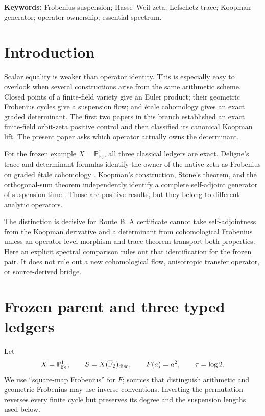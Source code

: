 \documentclass[11pt]{article}
\theoremstyle{remark}\newtheorem{remark}[theorem]{Remark}
\newcommand{\F}{\mathbb F}
\begin{document}
\medskip
\noindent\textbf{Keywords:} Frobenius suspension; Hasse--Weil zeta;
Lefschetz trace; Koopman generator; operator ownership; essential spectrum.

\section{Introduction}

Scalar equality is weaker than operator identity.  This is especially easy
to overlook when several constructions arise from the same arithmetic
scheme.  Closed points of a finite-field variety give an Euler product; their
geometric Frobenius cycles give a suspension flow; and étale cohomology gives
an exact graded determinant.  The first two papers in this branch established
an exact finite-field orbit-zeta positive control and then classified its
canonical Koopman lift.  The present paper asks which operator actually owns
the determinant.

For the frozen example \(X=\mathbb P^1_{\F_2}\), all three classical ledgers
are exact.  Deligne's trace and determinant formulas identify the owner of
the native zeta as Frobenius on graded étale cohomology
\citep{Deligne1974}.  Koopman's construction, Stone's theorem, and the
orthogonal-sum theorem independently identify a complete self-adjoint
generator of suspension time \citep{Koopman1931,Stone1932,Teschl2009}.
Those are positive results, but they belong to different analytic operators.

The distinction is decisive for Route B.  A certificate cannot take
self-adjointness from the Koopman derivative and a determinant from
cohomological Frobenius unless an operator-level morphism and trace theorem
transport both properties.  Here an explicit spectral comparison rules out
that identification for the frozen pair.  It does not rule out a new
cohomological flow, anisotropic transfer operator, or source-derived bridge.



\section{Frozen parent and three typed ledgers}

Let
\[
 X=\mathbb P^1_{\F_2},\qquad
 S=X(\overline{\F}_2)_{\rm disc},\qquad F(a)=a^2,
 \qquad \tau=\log2.
\]
We use ``square-map Frobenius'' for \(F\); sources that distinguish
arithmetic and geometric Frobenius may use inverse conventions.  Inverting
the permutation reverses every finite cycle but preserves its degree and the
suspension lengths used below.
\end{document}
